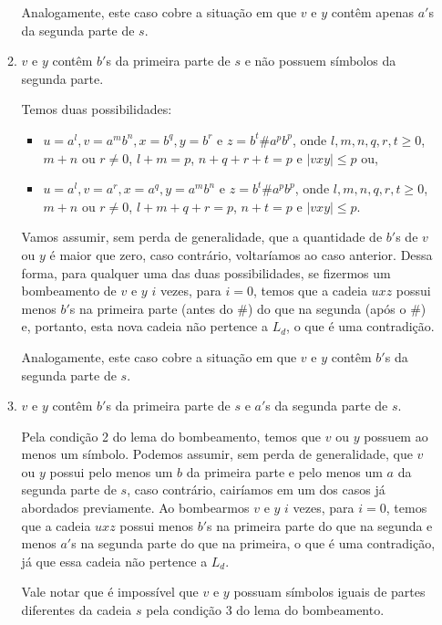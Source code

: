 \begin{enumerate}[label={\textbf{\alph*.}}]
\begin{enumerate}[label={\textbf{Caso \arabic*:}}]
        Analogamente, este caso cobre a situação em que $v$ e $y$ contêm apenas $a'$s da segunda parte de $s$.
        
        \item $v$ e $y$ contêm $b'$s da primeira parte de $s$ e não possuem símbolos da segunda parte.
        
        Temos duas possibilidades:
        \begin{itemize}
            \item $u = a^l, v = a^mb^n, x = b^q, y = b^r$ e $z = b^t\#a^pb^p$, onde $l, m, n, q, r, t \geq 0$, $m + n$ ou $r \neq 0$, $l + m = p$, $n + q + r + t = p$ e $|vxy| \leq p$ ou,
            
            \item $u = a^l, v = a^r, x = a^q, y = a^mb^n$ e $z = b^t\#a^pb^p$, onde $l, m, n, q, r, t \geq 0$, $m + n$ ou $r \neq 0$, $l + m + q + r = p$, $n + t = p$ e $|vxy| \leq p$.
        \end{itemize}
        
        Vamos assumir, sem perda de generalidade, que a quantidade de $b'$s de $v$ ou $y$ é maior que zero, caso contrário, voltaríamos ao caso anterior. Dessa forma, para qualquer uma das duas possibilidades, se fizermos um bombeamento de $v$ e $y$ $i$ vezes, para $i = 0$, temos que a cadeia $uxz$ possui menos $b'$s na primeira parte (antes do $\#$) do que na segunda (após o $\#$) e, portanto, esta nova cadeia não pertence a $L_d$, o que é uma contradição.
        
        Analogamente, este caso cobre a situação em que $v$ e $y$ contêm $b'$s da segunda parte de $s$.

        \item $v$ e $y$ contêm $b'$s da primeira parte de $s$ e $a'$s da segunda parte de $s$.
        
        Pela condição 2 do lema do bombeamento, temos que $v$ ou $y$ possuem ao menos um símbolo. Podemos assumir, sem perda de generalidade, que $v$ ou $y$ possui pelo menos um $b$ da primeira parte e pelo menos um $a$ da segunda parte de $s$, caso contrário, cairíamos em um dos casos já abordados previamente. Ao bombearmos $v$ e $y$ $i$ vezes, para $i = 0$, temos que a cadeia $uxz$ possui menos $b'$s na primeira parte do que na segunda e menos $a'$s na segunda parte do que na primeira, o que é uma contradição, já que essa cadeia não pertence a $L_d$.
        
        Vale notar que é impossível que $v$ e $y$ possuam símbolos iguais de partes diferentes da cadeia $s$ pela condição 3 do lema do bombeamento.
    \end{enumerate}

\end{enumerate}